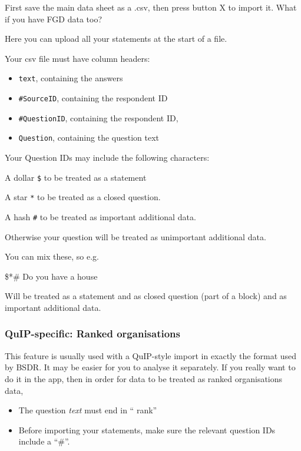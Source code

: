 \documentclass[
]{book}
\providecommand{\tightlist}{%
  \setlength{\itemsep}{0pt}\setlength{\parskip}{0pt}}
\begin{document}
First save the main data sheet as a .csv, then press button X to import it. What if you have FGD data too?

Here you can upload all your statements at the start of a file.

Your csv file must have column headers:

\begin{itemize}
\tightlist
\item
  \texttt{text}, containing the answers
\item
  \texttt{\#SourceID}, containing the respondent ID
\item
  \texttt{\#QuestionID}, containing the respondent ID,
\item
  \texttt{Question}, containing the question text
\end{itemize}

Your Question IDs may include the following characters:

A dollar \texttt{\$} to be treated as a statement

A star \texttt{*} to be treated as a closed question.

A hash \texttt{\#} to be treated as important additional data.

Otherwise your question will be treated as unimportant additional data.

You can mix these, so e.g.

\$*\# Do you have a house

Will be treated as a statement and as closed question (part of a block) and as important additional data.

\hypertarget{quip-specific-ranked-organisations}{%
\subsubsection{QuIP-specific: Ranked organisations}\label{quip-specific-ranked-organisations}}

This feature is usually used with a QuIP-style import in exactly the format used by BSDR. It may be easier for you to analyse it separately. If you really want to do it in the app, then in order for data to be treated as ranked organisations data,

\begin{itemize}
\tightlist
\item
  The question \emph{text} must end in `` rank''
\item
  Before importing your statements, make sure the relevant question IDs include a ``\#''.
\end{itemize}
\end{document}
